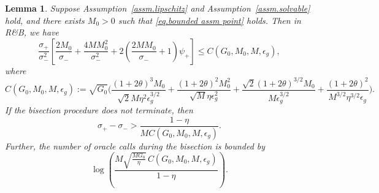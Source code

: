 \documentclass[10pt,a4paper]{amsart}
\newtheorem{lemma}{Lemma}
\begin{document}
\begin{lemma}
    \label{coro.bisection bound}
    Suppose Assumption~\ref{assm.lipschitz} and
    Assumption~\ref{assm.solvable} hold, and there exists \(M_0>0\) such that
    \eqref{eq.bounded assm point} holds. Then in \textnormal{R\&B}, we have
    \begin{equation}
        \label{eq.bisection-coefficient-bound}
        \frac{\sigma_+}{\sigma_-^2}
        \left[
            \frac{2M_0}{\sigma_-}
            +
            \frac{4MM_0^2}{\sigma_-^2}
            +
            2\left(
            \frac{2MM_0}{\sigma_-}+1
            \right)\psi_+
            \right] \leq
        C(G_0,M_0,M,\epsilon_g),
    \end{equation}
    where
    \begin{equation}
        \label{eq.definition C bisection}
        C(G_0,M_0,M,\epsilon_g)
        :=
        \sqrt{G_0}\Bigg(
        \frac{(1+2\theta)^3M_0}
            {\sqrt{2}M\eta^2\epsilon_g^{3/2}}
        +
        \frac{(1+2\theta)^2M_0^2}
            {\sqrt{M}\eta\epsilon_g^2}
        +
        \frac{\sqrt{2}(1+2\theta)^{3/2}M_0}
            {M\epsilon_g^{3/2}}
        +
        \frac{(1+2\theta)^2}
            {M^{3/2}\eta^{3/2}\epsilon_g}
        \Bigg).
    \end{equation}
    If the bisection procedure does not terminate, then
    \begin{equation}
        \label{eq.bound value by brackets}
        \sigma_+-\sigma_-
        >
        \frac{1-\eta}
        {M C(G_0,M_0,M,\epsilon_g)}.
    \end{equation}
    Further, the number of oracle calls during the bisection is bounded by
    \begin{equation}
        \label{eq.bisection-oracle-bound}
        \log\left(
        \frac{
                M\sqrt{\frac{MG_0}{\eta}}\,
                C(G_0,M_0,M,\epsilon_g)
            }{
                1-\eta
            }
        \right).
    \end{equation}
\end{lemma}
\end{document}
